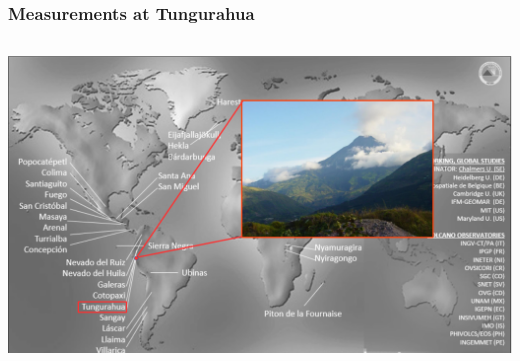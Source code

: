 \documentclass{beamer} %
\begin{document}
	
	
	
	
	
	
	
	\begin{frame}
		\frametitle{\color{mygreen}Measurements at Tungurahua\\
			\color{mygreen}{\rule{0.8\textwidth}{2pt}}}
		\vspace{-0.1cm}
		\begin{columns}
			\begin{column}{12cm}
				\includegraphics[width=1.0\linewidth]{../../Bilder/NOVAC2015SWTung}
			\end{column}
		\end{columns}
		
	\end{frame}
	
\end{document}
